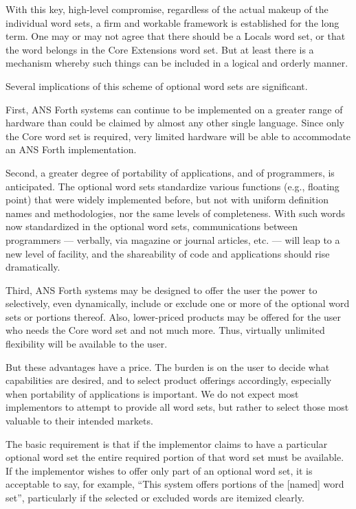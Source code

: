 With this key, high-level compromise, regardless of the actual
makeup of the individual word sets, a firm and workable framework
is established for the long term. One may or may not agree that
there should be a Locals word set, or that the word 
belongs in the Core Extensions word set. But at least there is a
mechanism whereby such things can be included in a logical and
orderly manner.

Several implications of this scheme of optional word sets are
significant.

First, ANS Forth systems can continue to be implemented on a greater
range of hardware than could be claimed by almost any other single
language. Since only the Core word set is required, very limited
hardware will be able to accommodate an ANS Forth implementation.

Second, a greater degree of portability of applications, and of
programmers, is anticipated. The optional word sets standardize
various functions (e.g., floating point) that were widely implemented
before, but not with uniform definition names and methodologies, nor
the same levels of completeness. With such words now standardized in
the optional word sets, communications between programmers ---
verbally, via magazine or journal articles, etc. --- will leap to a
new level of facility, and the shareability of code and applications
should rise dramatically.

Third, ANS Forth systems may be designed to offer the user the power
to selectively, even dynamically, include or exclude one or more of
the optional word sets or portions thereof. Also, lower-priced
products may be offered for the user who needs the Core word set
and not much more. Thus, virtually unlimited flexibility will be
available to the user.

But these advantages have a price. The burden is on the user to
decide what capabilities are desired, and to select product
offerings accordingly, especially when portability of applications
is important. We do not expect most implementors to attempt to
provide all word sets, but rather to select those most valuable to
their intended markets.

The basic requirement is that if the implementor claims to have a
particular optional word set the entire required portion of that
word set must be available. If the implementor wishes to offer only
part of an optional word set, it is acceptable to say, for example,
``This system offers portions of the [named] word set'', particularly
if the selected or excluded words are itemized clearly.


